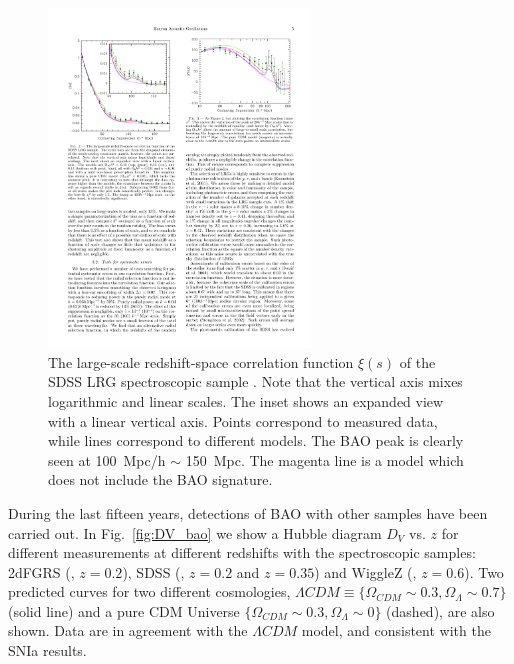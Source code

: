 \begin{figure}
\centering
\includegraphics[height=90mm]{./plots/bao_eisenstein.pdf} 
\caption{The large-scale redshift-space correlation function $\xi(s)$ of the SDSS LRG spectroscopic sample \citep{Eisenstein2005}. Note that the vertical axis mixes logarithmic and linear scales. The inset shows an expanded view with a linear vertical axis. Points correspond to measured data, while lines correspond to different models. The BAO peak is clearly seen at 100~Mpc/h $\sim$ 150~Mpc. The magenta line is a model which does not include the BAO signature.}
\label{fig:xi_bao}
\end{figure}
During the last fifteen years, detections of BAO with other samples have been carried out. In Fig.~\ref{fig:DV_bao} we show a Hubble diagram $D_V$ vs. $z$ for different measurements at different redshifts with the spectroscopic samples: 2dFGRS (\citet{Colless2001}, $z=0.2$), SDSS (\citet{York2000}, $z=0.2$ and $z=0.35$) and WiggleZ (\citet{Drinkwater2010}, $z=0.6$). Two predicted curves for two different cosmologies, $\Lambda CDM\equiv\lbrace \Omega_{CDM} \sim 0.3, \Omega_\Lambda \sim 0.7 \rbrace$ (solid line) and a pure CDM Universe $\lbrace \Omega_{CDM}\sim 0.3, \Omega_\Lambda \sim 0 \rbrace$ (dashed), are also shown. Data are in agreement with the $\Lambda CDM$ model, and consistent with the SNIa results.
